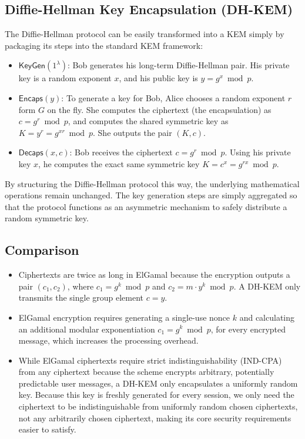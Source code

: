 \subsection{Diffie-Hellman Key Encapsulation (DH-KEM)}
The Diffie-Hellman protocol can be easily transformed into a KEM simply by packaging its steps into the standard KEM framework:

\begin{itemize}
    \item $\mathsf{KeyGen}(1^\lambda)$: Bob generates his long-term Diffie-Hellman pair. His private key is a random exponent $x$, and his public key is $y = g^x \bmod p$.
    \item $\mathsf{Encaps}(y)$: To generate a key for Bob, Alice chooses a random exponent $r$ form $G$ on the fly. She computes the ciphertext (the encapsulation) as $c = g^r \bmod p$, and computes the shared symmetric key as $K = y^r = g^{xr} \bmod p$. She outputs the pair $(K, c)$.
    \item $\mathsf{Decaps}(x, c)$: Bob receives the ciphertext $c = g^r \bmod p$. Using his private key $x$, he computes the exact same symmetric key $K = c^x = g^{rx} \bmod p$.
\end{itemize}

By structuring the Diffie-Hellman protocol this way, the underlying mathematical operations remain unchanged. The key generation steps are simply aggregated so that the protocol functions as an asymmetric mechanism to safely distribute a random symmetric key.



\subsection{Comparison}

\begin{itemize}
    \item Ciphertexts are twice as long in ElGamal because the encryption outputs a pair $(c_1, c_2)$, where $c_1 = g^k \bmod p$ and $c_2 = m \cdot y^k \bmod p$. A DH-KEM only transmits the single group element $c = y$.
    \item ElGamal encryption requires generating a single-use nonce $k$ and calculating an additional modular exponentiation $c_1 = g^k \bmod p$, for every encrypted message, which increases the processing overhead.
    \item While ElGamal ciphertexts require strict indistinguishability (IND-CPA) from any ciphertext because the scheme encrypts arbitrary, potentially predictable user messages, a DH-KEM only encapsulates a uniformly random key. Because this key is freshly generated for every session, we only need the ciphertext to be indistinguishable from uniformly random chosen ciphertexts, not any arbitrarily chosen ciphertext, making its core security requirements easier to satisfy.
\end{itemize}

